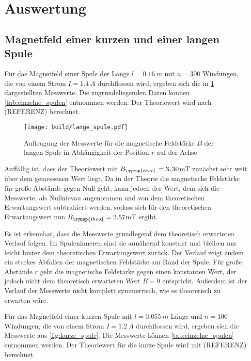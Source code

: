 \section{Auswertung}
\label{sec:Auswertung}

\subsection{Magnetfeld einer kurzen und einer langen Spule}

Für das Magnetfeld einer Spule der Länge $l=\SI{0,16}{m}$ mit $n=300$ Windungen,
die von einem Strom $I=\SI{1,4}{A}$ durchflossen wird, ergeben sich die in
\ref{fig:lange_spule} dargestellten Messwerte. Die zugrundeliegenden Daten können
\ref{tab:einzelne_spulen} entnommen werden. Der Theoriewert wird nach (REFERENZ) berechnet.

\begin{figure}
  \centering
  \texttt{[image: build/lange\_spule.pdf]}
  \caption{Auftragung der Messwerte für die magnetische Feldstärke $B$ der langen Spule
  in Abhängigkeit der Position $r$ auf der Achse}
  \label{fig:lange_spule}
\end{figure}

Auffällig ist, dass der Theoriewert mit $B_{\symup{theo}}=3,30$mT zunächst sehr weit über dem
gemessenen Wert liegt. Da in der Theorie die magnetische Feldstärke für große Abstände
gegen Null geht, kann jedoch der Wert, dem sich die Messwerte, als Nullnievau angenommen
und von dem theoretischen Erwartungswert subtrahiert werden, sodass sich für den
theoretischen Erwartungswert nun $B_{\symup{theo}}=2.57$mT ergibt.

Es ist erkennbar, dass die Messwerte grundlegend dem theoretisch erwarteten Verlauf folgen.
Im Spuleninneren sind sie annähernd konstant und bleiben nur leicht hinter dem
theoretischen Erwartungswert zurück. Der Verlauf zeigt zudem ein starkes Abfallen
der magnetischen Feldstärke am Rand der Spule. Für große Abstände $r$ geht die magnetische
Feldstärke gegen einen konstanten Wert, der jedoch nicht dem theoretisch erwarteten
Wert $B=0$ entspricht. Außerdem ist der Verlauf der Messwerte nicht komplett symmetrisch,
wie es theoretisch zu erwarten wäre.


Für das Magnetfeld einer kurzen Spule mit $l=\SI{0,055}{m}$ Länge und $n=100$ Windungen,
die von einem Strom $I=\SI{1,2}{A}$ durchflossen wird, ergeben sich die Messwerte aus
\ref{fig:kurze_spule}. Die Messwerte können \ref{tab:einzelne_spulen} entnommen werden.
Der Theoriewert für die kurze Spule wird mit (REFERENZ) berechnet.

